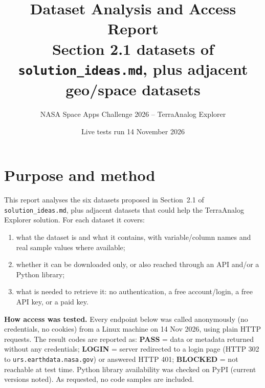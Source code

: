 \documentclass[10pt,a4paper]{article}
\title{\color{navy}\textbf{Dataset Analysis and Access Report}\\[0.3em]\large Section 2.1 datasets of \texttt{solution\_ideas.md}, plus adjacent geo/space datasets}
\author{NASA Space Apps Challenge 2026 -- TerraAnalog Explorer}
\date{Live tests run 14 November 2026}
\newcommand{\OK}{\textcolor{ok}{\textbf{PASS}}}
\newcommand{\AUTH}{\textcolor{mid}{\textbf{LOGIN}}}
\newcommand{\FAIL}{\textcolor{warn}{\textbf{BLOCKED}}}
\begin{document}
\maketitle\thispagestyle{empty}

\section*{Purpose and method}
This report analyses the six datasets proposed in Section~2.1 of \texttt{solution\_ideas.md}, plus adjacent datasets that could help the TerraAnalog Explorer solution. For each dataset it covers:
\begin{enumerate}
\item what the dataset is and what it contains, with variable/column names and real sample values where available;
\item whether it can be downloaded only, or also reached through an API and/or a Python library;
\item what is needed to retrieve it: no authentication, a free account/login, a free API key, or a paid key.
\end{enumerate}

\textbf{How access was tested.} Every endpoint below was called anonymously (no credentials, no cookies) from a Linux machine on 14 Nov 2026, using plain HTTP requests. The result codes are reported as:
\OK{} = data or metadata returned without any credentials;
\AUTH{} = server redirected to a login page (HTTP 302 to \texttt{urs.earthdata.nasa.gov}) or answered HTTP 401;
\FAIL{} = not reachable at test time.
Python library availability was checked on PyPI (current versions noted). As requested, no code samples are included.
\end{document}
